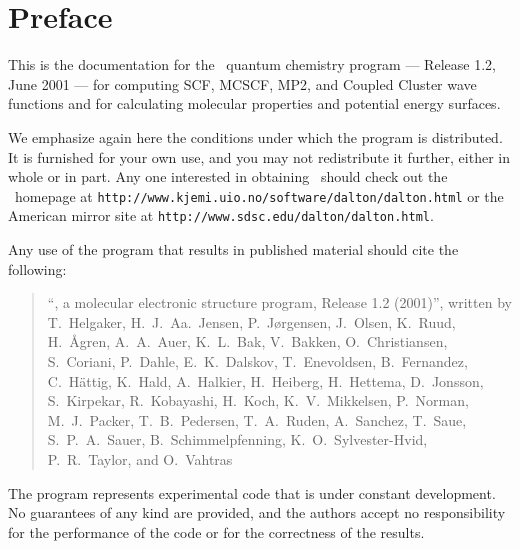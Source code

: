 \tableofcontents

\chapter*{Preface}

          This is the documentation for the \dalton\ 
quantum chemistry program --- Release 1.2, June 2001 --- for computing SCF,
MCSCF, MP2, and Coupled Cluster wave functions and for calculating 
molecular properties and potential energy surfaces.

          We emphasize again here the conditions under which the
program is distributed.  It is furnished for your own use,
and you may not redistribute it further, either in whole or in
part.  Any one interested in obtaining \dalton\ should check out the
\dalton\ homepage at
\verb|http://www.kjemi.uio.no/software/dalton/dalton.html| or the
American mirror site at
\verb|http://www.sdsc.edu/dalton/dalton.html|.

          Any use of the program that results in published
material should cite the following:
\begin{quote}
``\dalton , a molecular electronic  structure program, Release
1.2 (2001)'', written by 
T.~Helgaker, H.~J.~Aa.~Jensen, P.~J{\o}rgensen, J.~Olsen,
K.~Ruud, H.~{\AA}gren,
A.~A.~Auer,
K.~L.~Bak,
V.~Bakken,
O.~Christiansen,
S.~Coriani,
P.~Dahle,
E.~K.~Dalskov,
T.~Enevoldsen,
B.~Fernandez,
C.~H{\"a}ttig,
K.~Hald,
A.~Halkier,
H.~Heiberg,
H.~Hettema,
D.~Jonsson,
S.~Kirpekar,
R.~Kobayashi,
H.~Koch,
K.~V.~Mikkelsen,
P.~Norman,
M.~J.~Packer,
T.~B.~Pedersen,
T.~A.~Ruden,
A.~Sanchez,
T.~Saue,
S.~P.~A.~Sauer,
B.~Schimmelpfenning,
K.~O.~Sylvester-Hvid,
P.~R.~Taylor,
and O.~Vahtras
\end{quote}

          The program represents experimental code that is
under constant development.  No guarantees of any kind are
provided, and the authors accept no responsibility for the
performance of the code or for the correctness of the results.
